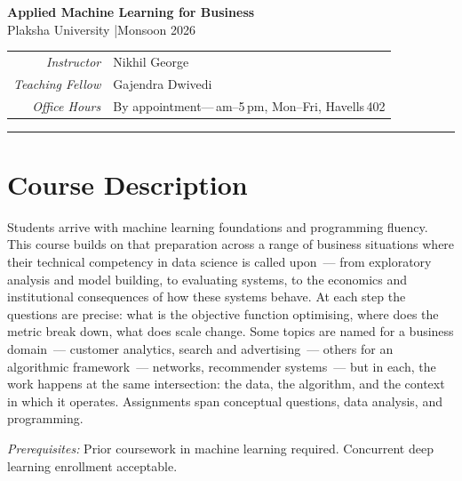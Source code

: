 \documentclass[11pt]{article}
\begin{document}

\begin{center}
  {\LARGE\textbf{Applied Machine Learning for Business}}\\[6pt]
  {\large Plaksha University \quad|\quad Monsoon 2026}\\[10pt]
  \begin{tabular}{rl}
    \textit{Instructor}     & Nikhil George \\
    \textit{Teaching Fellow} & Gajendra Dwivedi \\
    \textit{Office Hours}   & By appointment\enspace---\enspace11\,am--5\,pm, Mon--Fri, Havells\,402 \\
  \end{tabular}
\end{center}

\vspace{6pt}
\noindent\rule{\linewidth}{0.6pt}
\vspace{4pt}


\section*{Course Description}

Students arrive with machine learning foundations and programming fluency. This course builds on that preparation across a range of business situations where their technical competency in data science is called upon~--- from exploratory analysis and model building, to evaluating systems, to the economics and institutional consequences of how these systems behave. At each step the questions are precise: what is the objective function optimising, where does the metric break down, what does scale change. Some topics are named for a business domain~--- customer analytics, search and advertising~--- others for an algorithmic framework~--- networks, recommender systems~--- but in each, the work happens at the same intersection: the data, the algorithm, and the context in which it operates. Assignments span conceptual questions, data analysis, and programming.

\medskip
\textit{Prerequisites:} Prior coursework in machine learning required. Concurrent deep learning enrollment acceptable.

\end{document}

